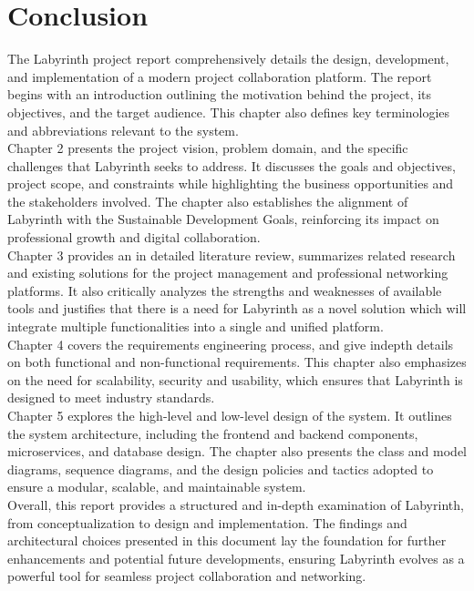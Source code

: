 \documentclass{FastFyp}
\begin{document}
\section{Conclusion}
The Labyrinth project report comprehensively details the design, development, and implementation of a modern project collaboration platform. The report begins with an introduction outlining the motivation behind the project, its objectives, and the target audience. This chapter also defines key terminologies and abbreviations relevant to the system.\\
Chapter 2 presents the project vision, problem domain, and the specific challenges that Labyrinth seeks to address. It discusses the goals and objectives, project scope, and constraints while highlighting the business opportunities and the stakeholders involved. The chapter also establishes the alignment of Labyrinth with the Sustainable Development Goals, reinforcing its impact on professional growth and digital collaboration. \\
Chapter 3 provides an in detailed literature review, summarizes related research and existing solutions for the project management and professional networking platforms. It also critically analyzes the strengths and weaknesses of available tools and justifies that there is a need for Labyrinth as a novel solution which will integrate multiple functionalities into a single and unified platform. \\
Chapter 4 covers the requirements engineering process, and give indepth details on both functional and non-functional requirements. This chapter also emphasizes on the need for scalability, security and usability, which ensures that Labyrinth is designed to meet industry standards. \\
Chapter 5 explores the high-level and low-level design of the system. It outlines the system architecture, including the frontend and backend components, microservices, and database design. The chapter also presents the class and model diagrams, sequence diagrams, and the design policies and tactics adopted to ensure a modular, scalable, and maintainable system. \\
Overall, this report provides a structured and in-depth examination of Labyrinth, from conceptualization to design and implementation. The findings and architectural choices presented in this document lay the foundation for further enhancements and potential future developments, ensuring Labyrinth evolves as a powerful tool for seamless project collaboration and networking.
\end{document}
